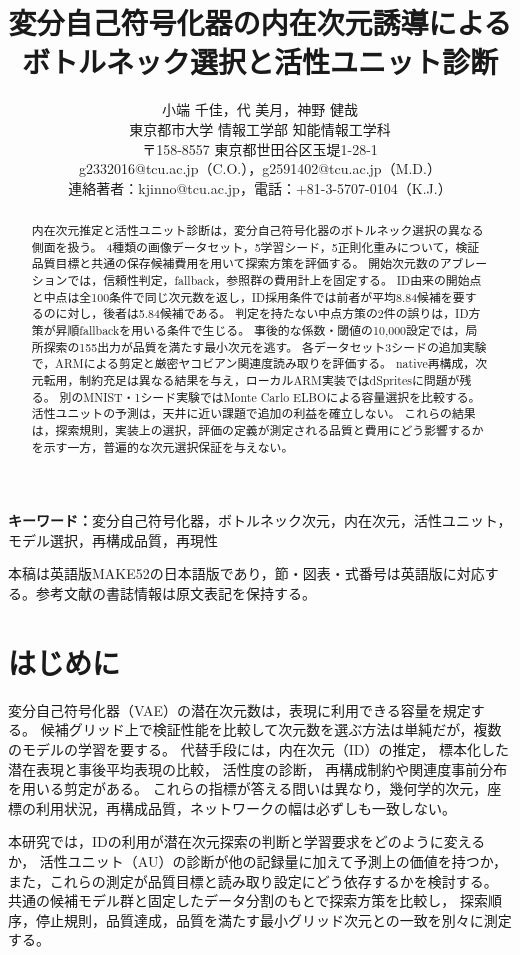 \documentclass[11pt,a4paper]{ltjsarticle}
\title{変分自己符号化器の内在次元誘導による\\ボトルネック選択と活性ユニット診断}
\author{小端 千佳，代 美月，神野 健哉\\
東京都市大学 情報工学部 知能情報工学科\\
{\small 〒158-8557 東京都世田谷区玉堤1-28-1}\\
{\small g2332016@tcu.ac.jp（C.O.），g2591402@tcu.ac.jp（M.D.）}\\
{\small 連絡著者：kjinno@tcu.ac.jp，電話：+81-3-5707-0104（K.J.）}}
\date{}
\begin{document}
\maketitle
\begin{abstract}
内在次元推定と活性ユニット診断は，変分自己符号化器のボトルネック選択の異なる側面を扱う。
4種類の画像データセット，5学習シード，5正則化重みについて，検証品質目標と共通の保存候補費用を用いて探索方策を評価する。
開始次元数のアブレーションでは，信頼性判定，fallback，参照群の費用計上を固定する。
ID由来の開始点と中点は全100条件で同じ次元数を返し，ID採用条件では前者が平均8.84候補を要するのに対し，後者は5.84候補である。
判定を持たない中点方策の2件の誤りは，ID方策が昇順fallbackを用いる条件で生じる。
事後的な係数・閾値の10,000設定では，局所探索の155出力が品質を満たす最小次元を逃す。
各データセット3シードの追加実験で，ARMによる剪定と厳密ヤコビアン関連度読み取りを評価する。
native再構成，次元転用，制約充足は異なる結果を与え，ローカルARM実装ではdSpritesに問題が残る。
別のMNIST・1シード実験ではMonte Carlo ELBOによる容量選択を比較する。
活性ユニットの予測は，天井に近い課題で追加の利益を確立しない。
これらの結果は，探索規則，実装上の選択，評価の定義が測定される品質と費用にどう影響するかを示す一方，普遍的な次元選択保証を与えない。
\end{abstract}
\noindent\textbf{キーワード：}変分自己符号化器，ボトルネック次元，内在次元，活性ユニット，モデル選択，再構成品質，再現性
\par\smallskip
{\small 本稿は英語版MAKE52の日本語版であり，節・図表・式番号は英語版に対応する。参考文献の書誌情報は原文表記を保持する。}
\par\medskip
\section{はじめに}\label{sec:intro}

変分自己符号化器（VAE）\cite{kingma2014vae}の潜在次元数は，表現に利用できる容量を規定する。
候補グリッド上で検証性能を比較して次元数を選ぶ方法は単純だが，複数のモデルの学習を要する。
代替手段には，内在次元（ID）の推定\cite{facco2017twonn,levina2005mle}，
標本化した潜在表現と事後平均表現の比較\cite{bonheme2022fondue}，
活性度の診断\cite{burda2016iwae,bonheme2023active}，
再構成制約や関連度事前分布を用いる剪定\cite{deboom2020geco,saha2025ardvae}がある。
これらの指標が答える問いは異なり，幾何学的次元，座標の利用状況，再構成品質，ネットワークの幅は必ずしも一致しない。

本研究では，IDの利用が潜在次元探索の判断と学習要求をどのように変えるか，
活性ユニット（AU）の診断が他の記録量に加えて予測上の価値を持つか，
また，これらの測定が品質目標と読み取り設定にどう依存するかを検討する。
共通の候補モデル群と固定したデータ分割のもとで探索方策を比較し，
探索順序，停止規則，品質達成，品質を満たす最小グリッド次元との一致を別々に測定する。
\end{document}
